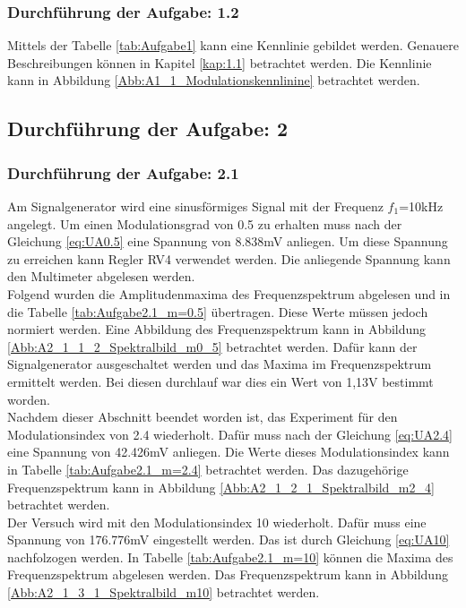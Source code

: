 \documentclass[12pt]{scrartcl}
\begin{document}
\subsubsection*{Durchführung der Aufgabe: 1.2}
Mittels der Tabelle \ref{tab:Aufgabe1} kann eine Kennlinie gebildet werden. 
Genauere Beschreibungen können in Kapitel \ref{kap:1.1} betrachtet werden. 
Die Kennlinie kann in Abbildung \ref{Abb:A1_1_Modulationskennlinine} betrachtet werden.
\subsection{Durchführung der Aufgabe: 2}
\subsubsection*{Durchführung der Aufgabe: 2.1}
Am Signalgenerator wird eine sinusförmiges Signal mit der Frequenz $f_1$=10kHz angelegt. 
Um einen Modulationsgrad von 0.5 zu erhalten muss nach der Gleichung \ref{eq:UA0.5} eine Spannung von 8.838mV anliegen. 
Um diese Spannung zu erreichen kann Regler RV4 verwendet werden.
Die anliegende Spannung kann den Multimeter abgelesen werden. \\
Folgend wurden die Amplitudenmaxima des Frequenzspektrum abgelesen und in die Tabelle \ref{tab:Aufgabe2.1_m=0.5} übertragen.
Diese Werte müssen jedoch normiert werden. 
Eine Abbildung des Frequenzspektrum kann in Abbildung \ref{Abb:A2_1_1_2_Spektralbild_m0_5} betrachtet werden.
Dafür kann der Signalgenerator ausgeschaltet werden und das Maxima im Frequenzspektrum ermittelt werden. 
Bei diesen durchlauf war dies ein Wert von 1,13V bestimmt worden.\\
Nachdem dieser Abschnitt beendet worden ist, das Experiment für den Modulationsindex von 2.4 wiederholt. 
Dafür muss nach der Gleichung \ref{eq:UA2.4} eine Spannung von 42.426mV anliegen. 
Die Werte dieses Modulationsindex kann in Tabelle \ref{tab:Aufgabe2.1_m=2.4} betrachtet werden.
Das dazugehörige Frequenzspektrum kann in Abbildung \ref{Abb:A2_1_2_1_Spektralbild_m2_4} betrachtet werden.\\
Der Versuch wird mit den Modulationsindex 10 wiederholt. 
Dafür muss eine Spannung von 176.776mV eingestellt werden. 
Das ist durch Gleichung \ref{eq:UA10} nachfolzogen werden. 
In Tabelle \ref{tab:Aufgabe2.1_m=10} können die Maxima des Frequenzspektrum abgelesen werden.
Das Frequenzspektrum kann in Abbildung \ref{Abb:A2_1_3_1_Spektralbild_m10} betrachtet werden.
\end{document}
